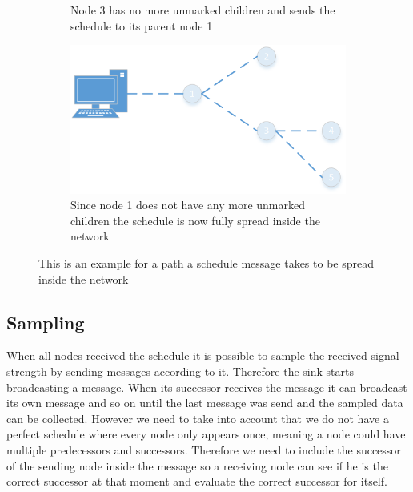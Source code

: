 \begin{figure}[htbp]
\begin{subfigure}[t]{0.4\textwidth}
   	 	\caption{Node 3 has no more unmarked children and sends the schedule to its parent node 1}
    	\label{fig:spreading9}
    \end{subfigure}
    \quad
    \quad	
    \begin{subfigure}[t]{0.4\textwidth}
		\centering         
        \includegraphics[scale=0.6]{content/images/ScheduleSpreading/Part10}
        \caption{Since node 1 does not have any more unmarked children the schedule is now fully spread inside the network}
        \label{fig:spreading10}
    \end{subfigure}
    \caption{This is an example for a path a schedule message takes to be spread inside the network}
     \label{fig:spreading}
\end{figure}

\subsection{Sampling}
\label{chp:apr_sampling}
When all nodes received the schedule it is possible to sample the received signal strength by sending messages according to it. Therefore the sink starts broadcasting a message. When its successor receives the message it can broadcast its own message and so on until the last message was send and the sampled data can be collected. However we need to take into account that we do not have a perfect schedule where every node only appears once, meaning a node could have multiple predecessors and successors. Therefore we need to include the successor of the sending node inside the message so a receiving node can see if he is the correct successor at that moment and evaluate the correct successor for itself. 
